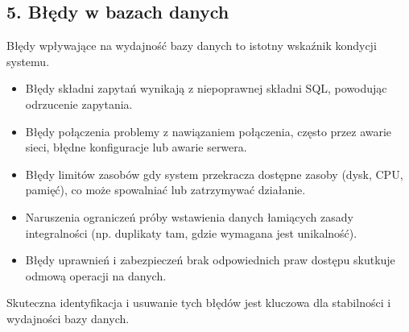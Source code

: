 \documentclass[a4paper,11pt,openany,english]{sphinxmanual}
\begin{document}
\subsection{5. Błędy w bazach danych}
\label{\detokenize{rozdzial2/index:bledy-w-bazach-danych}}
\sphinxAtStartPar
Błędy wpływające na wydajność bazy danych to istotny wskaźnik kondycji systemu.
\begin{description}
\begin{itemize}
\item {} 
\sphinxAtStartPar
Błędy składni zapytań \textendash{} wynikają z niepoprawnej składni SQL, powodując odrzucenie zapytania.

\item {} 
\sphinxAtStartPar
Błędy połączenia \textendash{} problemy z nawiązaniem połączenia, często przez awarie sieci, błędne konfiguracje lub awarie serwera.

\item {} 
\sphinxAtStartPar
Błędy limitów zasobów \textendash{} gdy system przekracza dostępne zasoby (dysk, CPU, pamięć), co może spowalniać lub zatrzymywać działanie.

\item {} 
\sphinxAtStartPar
Naruszenia ograniczeń \textendash{} próby wstawienia danych łamiących zasady integralności (np. duplikaty tam, gdzie wymagana jest unikalność).

\item {} 
\sphinxAtStartPar
Błędy uprawnień i zabezpieczeń \textendash{} brak odpowiednich praw dostępu skutkuje odmową operacji na danych.

\end{itemize}

\sphinxAtStartPar
Skuteczna identyfikacja i usuwanie tych błędów jest kluczowa dla stabilności i wydajności bazy danych.

\end{description}
\end{document}

